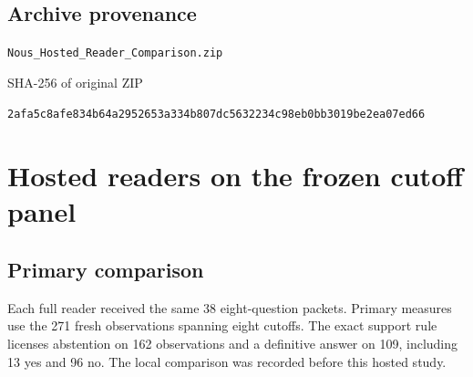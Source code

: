 \documentclass[11pt,letterpaper]{article}
\begin{document}
\subsection*{Archive provenance}

\nolinkurl{Nous_Hosted_Reader_Comparison.zip}\par

\small\sffamily SHA-256 of original ZIP\par\normalfont\small\nolinkurl{2afa5c8afe834b64a2952653a334b807dc5632234c98eb0bb3019be2ea07ed66}\par

\clearpage\normalsize\tableofcontents\clearpage{}

\section*{Hosted readers on the frozen cutoff panel}

\subsection{Primary comparison}

Each full reader received the same 38 eight-question packets. Primary measures use the 271 fresh observations spanning eight cutoffs. The exact support rule licenses abstention on 162 observations and a definitive answer on 109, including 13 yes and 96 no. The local comparison was recorded before this hosted study.
\end{document}
